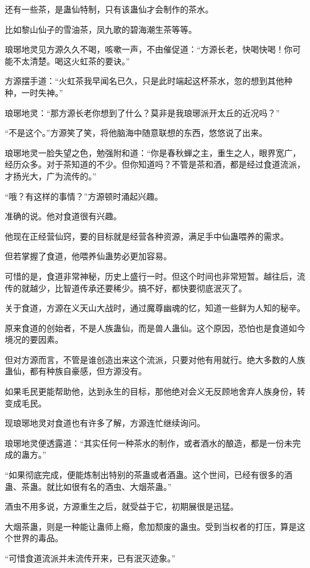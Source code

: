 \begin{this_body}
还有一些茶，是蛊仙特制，只有该蛊仙才会制作的茶水。

比如黎山仙子的雪油茶，凤九歌的碧海潮生茶等等。

琅琊地灵见方源久久不喝，咳嗽一声，不由催促道：“方源长老，快喝快喝！你可能不太清楚。喝这火虹茶的要诀。”

方源摆手道：“火虹茶我早闻名已久，只是此时端起这杯茶水，忽的想到其他种种，一时失神。”

琅琊地灵：“那方源长老你想到了什么？莫非是我琅琊派开太丘的近况吗？”

“不是这个。”方源笑了笑，将他脑海中随意联想的东西，悠悠说了出来。

琅琊地灵一脸失望之色，勉强附和道：“你是春秋蝉之主，重生之人，眼界宽广，经历众多。对于茶知道的不少。但你知道吗？不管是茶和酒，都是经过食道流派，才扬光大，广为流传的。”

“哦？有这样的事情？”方源顿时涌起兴趣。

准确的说。他对食道很有兴趣。

他现在正经营仙窍，要的目标就是经营各种资源，满足手中仙蛊喂养的需求。

但若掌握了食道，他喂养仙蛊势必更加容易。

可惜的是，食道非常神秘，历史上盛行一时。但这个时间也非常短暂。越往后，流传的就越少，比智道传承还要稀少。搞不好，都快要彻底泯灭了。

关于食道，方源在义天山大战时，通过魔尊幽魂的忆，知道一些鲜为人知的秘辛。

原来食道的创始者，不是人族蛊仙，而是兽人蛊仙。这个原因，恐怕也是食道如今境况的要因素。

但对方源而言，不管是谁创造出来这个流派，只要对他有用就行。绝大多数的人族蛊仙，都有种族自豪感，但方源没有。

如果毛民更能帮助他，达到永生的目标，那他绝对会义无反顾地舍弃人族身份，转变成毛民。

现琅琊地灵对食道也有许多了解，方源连忙继续询问。

琅琊地灵便透露道：“其实任何一种茶水的制作，或者酒水的酿造，都是一份未完成的蛊方。”

“如果彻底完成，便能炼制出特别的茶蛊或者酒蛊。这个世间，已经有很多的酒蛊、茶蛊。就比如很有名的酒虫、大烟茶蛊。”

酒虫不用多说，方源重生之后，就受益于它，初期展很是迅猛。

大烟茶蛊，则是一种能让蛊师上瘾，愈加颓废的蛊虫。受到当权者的打压，算是这个世界的毒品。

“可惜食道流派并未流传开来，已有泯灭迹象。”


\end{this_body}
